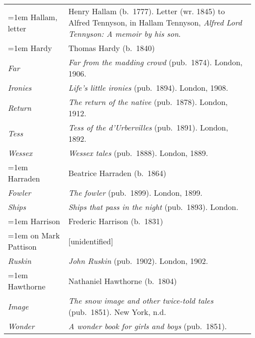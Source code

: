 \begin{xltabular}{\textwidth}{ lQ }
\hangindent=1em  Hallam, letter & Henry Hallam (b.~1777). Letter (wr. 1845) to Alfred Tennyson, in Hallam Tennyson, \textit{Alfred Lord Tennyson: A memoir by his son}. \\ %

\hangindent=1em  Hardy & Thomas Hardy (b.~1840) \\
\hspace{1em}\textit{Far} & \textit{Far from the madding crowd} (pub.~1874). London, 1906. \\
\hspace{1em}\textit{Ironies} & \textit{Life's little ironies} (pub.~1894). London, 1908. \\
\hspace{1em}\textit{Return} & \textit{The return of the native} (pub.~1878). London, 1912. \\
\hspace{1em}\textit{Tess} &\textit{Tess of the d'Urbervilles} (pub.~1891). London, 1892. \\
\hspace{1em}\textit{Wessex} & \textit{Wessex tales} (pub.~1888).  London, 1889. \\

\hangindent=1em  Harraden & Beatrice Harraden (b.~1864) \\
\hspace{1em}\textit{Fowler} & \textit{The fowler} (pub.~1899). London, 1899.  \\
\hspace{1em}\textit{Ships} & \textit{Ships that pass in the night} (pub.~1893). London.  \\

\hangindent=1em  Harrison & Frederic Harrison (b.~1831) \\
\hangindent=1em  \hspace{1em}on Mark Pattison & [unidentified] \\ %
\hspace{1em}\textit{Ruskin} & \textit{John Ruskin} (pub.~1902). London, 1902. \\

\hangindent=1em  Hawthorne & Nathaniel Hawthorne (b.~1804) \\
\hspace{1em}\textit{Image} & \textit{The snow image and other twice-told tales} (pub.~1851). New York, n.d. \\
\hspace{1em}\textit{Wonder} & \textit{A wonder book for girls and boys} (pub.~1851). \\ %


\end{xltabular}
